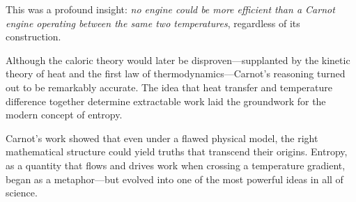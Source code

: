This was a profound insight: \emph{no engine could be more efficient than a Carnot engine operating between the same two temperatures}, regardless of its construction.










Although the caloric theory would later be disproven—supplanted by the kinetic theory of heat and the first law of thermodynamics—Carnot’s reasoning turned out to be remarkably accurate. The idea that heat transfer and temperature difference together determine extractable work laid the groundwork for the modern concept of entropy.

Carnot’s work showed that even under a flawed physical model, the right mathematical structure could yield truths that transcend their origins. Entropy, as a quantity that flows and drives work when crossing a temperature gradient, began as a metaphor—but evolved into one of the most powerful ideas in all of science.




